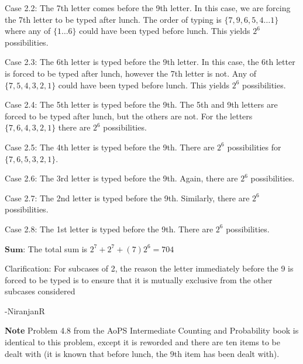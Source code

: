 \begin{enumerate}
 Case 2.2: The 7th letter comes before the 9th letter. In this case, we are forcing the 7th letter to be typed after lunch. The order of typing is $\{7, 9, 6, 5, 4\ldots1\}$ where any of $\{1\ldots6\}$ could have been typed before lunch. This yields $2^6$ possibilities.

 Case 2.3: The 6th letter is typed before the 9th letter. In this case, the 6th letter is forced to be typed after lunch, however the 7th letter is not. Any of $\{7, 5, 4, 3, 2, 1\}$ could have been typed before lunch. This yields $2^6$ possibilities.

 Case 2.4: The 5th letter is typed before the 9th. The 5th and 9th letters are forced to be typed after lunch, but the others are not. For the letters $\{7, 6, 4, 3, 2, 1\}$ there are $2^6$ possibilities.

 Case 2.5: The 4th letter is typed before the 9th. There are $2^6$ possibilities for $\{7, 6, 5, 3, 2, 1\}$.

 Case 2.6: The 3rd letter is typed before the 9th. Again, there are $2^6$ possibilities.

 Case 2.7: The 2nd letter is typed before the 9th. Similarly, there are $2^6$ possibilities.

 Case 2.8: The 1st letter is typed before the 9th. There are $2^6$ possibilities.

 $\textbf{Sum:}$ The total sum is $2^7 + 2^7 + (7)2^6 = \boxed{704}$

 Clarification: For subcases of 2, the reason the letter immediately before the 9 is forced to be typed is to ensure that it is mutually exclusive from the other subcases considered

 -NiranjanR

 \textbf{Note} Problem 4.8 from the AoPS Intermediate Counting and Probability book is identical to this problem, except it is reworded and there are ten items to be dealt with (it is known that before lunch, the $9$th item has been dealt with).

 


\end{enumerate}